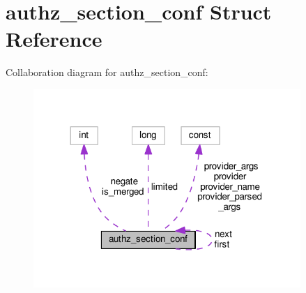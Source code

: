 \hypertarget{structauthz__section__conf}{}\section{authz\+\_\+section\+\_\+conf Struct Reference}
\label{structauthz__section__conf}


Collaboration diagram for authz\+\_\+section\+\_\+conf\+:
\nopagebreak
\begin{figure}[H]
\begin{center}
\leavevmode
\includegraphics[width=287pt]{structauthz__section__conf__coll__graph}
\end{center}
\end{figure}
